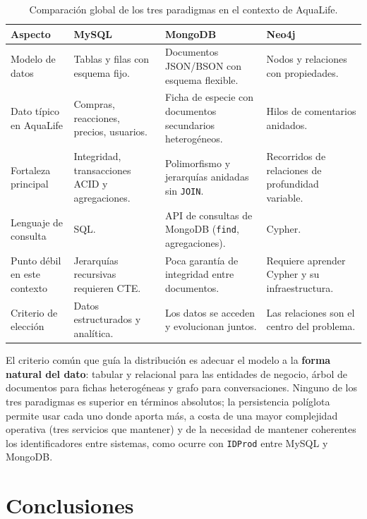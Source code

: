 \documentclass[11pt, a4paper]{article}
\begin{document}
\begin{table}[H]
\centering
\small
\begin{tabular}{
    >{\raggedright\arraybackslash}p{2.4cm}
    >{\raggedright\arraybackslash}p{3.8cm}
    >{\raggedright\arraybackslash}p{3.8cm}
    >{\raggedright\arraybackslash}p{3.8cm}}
\toprule
\textbf{Aspecto} & \textbf{MySQL} & \textbf{MongoDB} & \textbf{Neo4j} \\
\midrule
Modelo de datos & Tablas y filas con esquema fijo. & Documentos JSON/BSON con esquema flexible. & Nodos y relaciones con propiedades. \\
Dato típico en AquaLife & Compras, reacciones, precios, usuarios. & Ficha de especie con documentos secundarios heterogéneos. & Hilos de comentarios anidados. \\
Fortaleza principal & Integridad, transacciones ACID y agregaciones. & Polimorfismo y jerarquías anidadas sin \texttt{JOIN}. & Recorridos de relaciones de profundidad variable. \\
Lenguaje de consulta & SQL. & API de consultas de MongoDB (\texttt{find}, agregaciones). & Cypher. \\
Punto débil en este contexto & Jerarquías recursivas requieren CTE. & Poca garantía de integridad entre documentos. & Requiere aprender Cypher y su infraestructura. \\
Criterio de elección & Datos estructurados y analítica. & Los datos se acceden y evolucionan juntos. & Las relaciones son el centro del problema. \\
\bottomrule
\end{tabular}
\caption{Comparación global de los tres paradigmas en el contexto de AquaLife.}
\end{table}

El criterio común que guía la distribución es adecuar el modelo a la \textbf{forma natural del dato}: tabular y relacional para las entidades de negocio, árbol de documentos para fichas heterogéneas y grafo para conversaciones. Ninguno de los tres paradigmas es superior en términos absolutos; la persistencia políglota permite usar cada uno donde aporta más, a costa de una mayor complejidad operativa (tres servicios que mantener) y de la necesidad de mantener coherentes los identificadores entre sistemas, como ocurre con \texttt{IDProd} entre MySQL y MongoDB.

\section{Conclusiones}\label{sec:concl}
\end{document}
